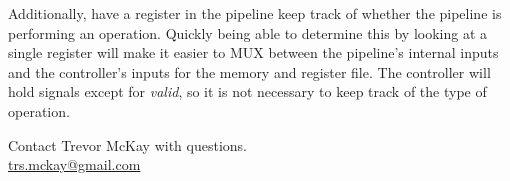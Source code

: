\documentclass[10pt,a4paper]{article}
\begin{document}
Additionally, have a register in the pipeline keep track of whether the pipeline is performing an
operation. Quickly being able to determine this by looking at a single register
will make it easier to MUX between the pipeline's internal inputs and the controller's inputs for
the memory and register file. The controller will hold signals except for \emph{valid}, so it is not
necessary to keep track of the type of operation.

\vspace*{\fill}
\begin{center}
    \noindent Contact Trevor McKay with questions.\\
    \href{mailto:trs.mckay@gmail.com}{trs.mckay@gmail.com}
\end{center}
\end{document}
